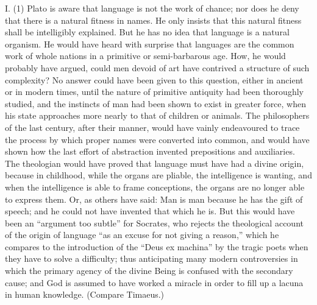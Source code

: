 \documentclass[11pt,letter]{article}
\begin{document}
\par  I. (1) Plato is aware that language is not the work of chance; nor does he deny that there is a natural fitness in names. He only insists that this natural fitness shall be intelligibly explained. But he has no idea that language is a natural organism. He would have heard with surprise that languages are the common work of whole nations in a primitive or semi-barbarous age. How, he would probably have argued, could men devoid of art have contrived a structure of such complexity? No answer could have been given to this question, either in ancient or in modern times, until the nature of primitive antiquity had been thoroughly studied, and the instincts of man had been shown to exist in greater force, when his state approaches more nearly to that of children or animals. The philosophers of the last century, after their manner, would have vainly endeavoured to trace the process by which proper names were converted into common, and would have shown how the last effort of abstraction invented prepositions and auxiliaries. The theologian would have proved that language must have had a divine origin, because in childhood, while the organs are pliable, the intelligence is wanting, and when the intelligence is able to frame conceptions, the organs are no longer able to express them. Or, as others have said: Man is man because he has the gift of speech; and he could not have invented that which he is. But this would have been an “argument too subtle” for Socrates, who rejects the theological account of the origin of language “as an excuse for not giving a reason,” which he compares to the introduction of the “Deus ex machina” by the tragic poets when they have to solve a difficulty; thus anticipating many modern controversies in which the primary agency of the divine Being is confused with the secondary cause; and God is assumed to have worked a miracle in order to fill up a lacuna in human knowledge. (Compare Timaeus.)
\end{document}
